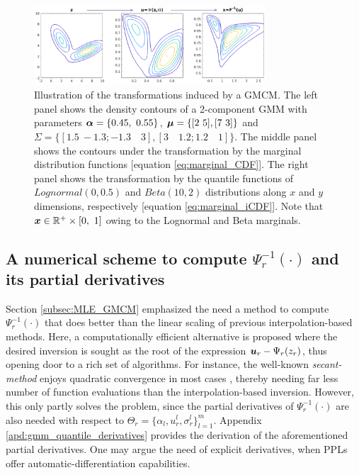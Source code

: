 \documentclass{article}
\theoremstyle{plain}
\theoremstyle{definition}
\theoremstyle{remark}
\begin{document}
\begin{figure}[ht]
\centering
\includegraphics[width= 245pt]{figures/figure_gmcm_transformation}
\caption{Illustration of the transformations induced by a GMCM. The left panel shows the density contours of a 2-component GMM with parameters $\bs{\alpha} = \{0.45, \ 0.55\}$, $\boldsymbol{\mu} =\{[2 \ 5], [7 \ 3] \}$ and  $ \Sigma= \{[1.5 \  -1.3 ; -1.3 \quad 3 ],[3 \quad 1.2 ; 1.2 \quad 1] \}$. The middle panel shows the contours under the transformation by the marginal distribution functions [equation \eqref{eq:marginal_CDF}]. The right panel shows the transformation  by the quantile functions of $Lognormal(0,0.5)$ and $Beta(10,2)$ distributions along $x$ and $y$ dimensions, respectively [equation \eqref{eq:marginal_iCDF}]. Note that $\boldsymbol{x}\in \mathbb{R}^+\times [0,\ 1]$ owing to the Lognormal and Beta marginals.}

\label{fig:gmcm_transformation}
\end{figure}
\subsection{A numerical scheme to compute $\Psi^{-1}_r(\cdot)$ and its partial derivatives} 
Section \ref{subsec:MLE_GMCM} emphasized the need a method to compute $\Psi^{-1}_r(\cdot)$ that does better than the linear scaling of previous interpolation-based methods. Here, a computationally efficient alternative is proposed where the desired inversion is sought as the root of the expression $\boldsymbol{u}_r-\Psi_r(z_r)$, thus opening door to a rich set of algorithms. For instance, the well-known \emph{secant-method} enjoys quadratic convergence in most cases \citep{diez2003}, thereby needing far less number of function evaluations than the interpolation-based inversion. However, this only partly solves the problem, since the partial derivatives of $\Psi^{-1}_r(\cdot)$ are also needed with respect to $\Theta_r=\{\alpha_l,u_r^l,\sigma_r^l\}_{l=1}^m$. Appendix \ref{apd:gmm_quantile_derivatives} provides the derivation of the aforementioned partial derivatives. One may argue the need of explicit derivatives, when PPLs offer automatic-differentiation capabilities. 
\end{document}
